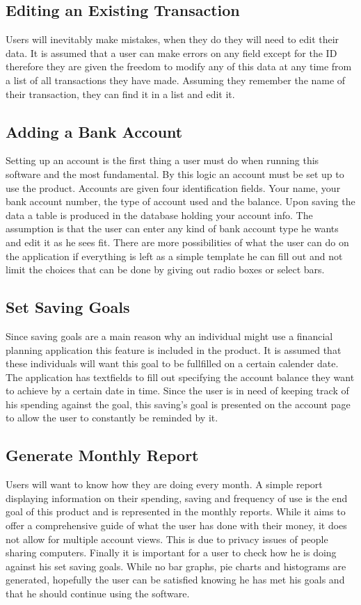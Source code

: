 \documentclass[12pt]{article}
\begin{document}
\subsection{Editing an Existing Transaction}
	Users will inevitably make mistakes, when they do they will need to edit their data. It is assumed that a user can make errors on any field except for the ID therefore they are given the freedom to modify any of this data at any time from a list of all transactions they have made. Assuming they remember the name of their transaction, they can find it in a list and edit it. 
\subsection{Adding a Bank Account}
	Setting up an account is the first thing a user must do when running this software and the most fundamental. By this logic an account must be set up to use the product. Accounts are given four identification fields. Your name, your bank account number, the type of account used and the balance. Upon saving the data a table is produced in the database holding your account info. The assumption is that the user can enter any kind of bank account type he wants and edit it as he sees fit. There are more possibilities of what the user can do on the application if everything is left as a simple template he can fill out and not limit the choices that can be done by giving out radio boxes or select bars.
\subsection{Set Saving Goals}
	Since saving goals are a main reason why an individual might use a financial planning application this feature is included in the product. It is assumed that these individuals will want this goal to be fullfilled on a certain calender date. The application has textfields to fill out specifying the account balance they want to achieve by a certain date in time. Since the user is in need of keeping track of his spending against the goal, this saving's goal is presented on the account page to allow the user to constantly be reminded by it.
	
\subsection{Generate Monthly Report}
	Users will want to know how they are doing every month. A simple report displaying information on their spending, saving and frequency of use is the end goal of this product and is represented in the monthly reports. While it aims to offer a comprehensive guide of what the user has done with their money, it does not allow for multiple account views. This is due to privacy issues of people sharing computers. Finally it is important for a user to check how he is doing against his set saving goals. While no bar graphs, pie charts and histograms are generated, hopefully the user can be satisfied knowing he has met his goals and that he should continue using the software.
	
\end{document}
